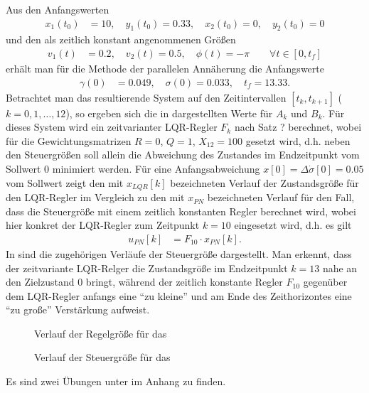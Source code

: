 \begin{exmp}\label{exmp:kap_3_bsp_rf_c2}
Aus den Anfangswerten
\begin{align*}
	x_1(t_0) & = 10,\quad y_1(t_0) = 0.33,\quad x_2(t_0) = 0,\quad y_2(t_0)=0
\end{align*}
und den als zeitlich konstant angenommenen Größen
\begin{align}
	v_1(t) & = 0.2,\quad v_2(t) = 0.5,\quad \phi(t)=-\pi\qquad\forall t\in[0,t_f]
\end{align}
erhält man für die Methode der parallelen Annäherung die Anfangswerte
\begin{align}
	\gamma(0) & = 0.049,\quad \sigma(0)=0.033,\quad t_f=13.33.
\end{align}
Betrachtet man das resultierende System  auf den Zeitintervallen $[t_k,t_{k+1}]$ ($k=0,1,\ldots,12$), so ergeben sich die in
 dargestellten Werte für $A_k$ und $B_k$. Für dieses System wird ein zeitvarianter \ac{LQR}-Regler $F_k$ nach Satz ? berechnet, wobei für die
Gewichtungsmatrizen $R=0$, $Q=1$, $X_{12}=100$ gesetzt wird, d.h. neben den Steuergrößen soll allein die Abweichung des Zustandes im Endzeitpunkt vom Sollwert $0$ minimiert werden. Für
eine Anfangsabweichung $x[0]=\Delta\dot{\sigma}[0]=0.05$ vom Sollwert zeigt  den mit $x_{LQR}[k]$ bezeichneten Verlauf der Zustandsgröße
für den \ac{LQR}-Regler im Vergleich zu den mit $x_{PN}$ bezeichneten Verlauf für den Fall, dass die Steuergröße mit einem zeitlich konstanten Regler berechnet wird, wobei hier konkret
der \ac{LQR}-Regler zum Zeitpunkt $k=10$ eingesetzt wird, d.h. es gilt
\begin{align}
	u_{PN}[k] & = F_{10}\cdot x_{PN}[k]. \label{eqn:kap_3_bsp_rf_bsp_konst_regler}
\end{align}
In  sind die zugehörigen Verläufe der Steuergröße dargestellt. Man erkennt, dass der zeitvariante \ac{LQR}-Relger die Zustandsgröße im
Endzeitpunkt $k=13$ nahe an den Zielzustand $0$ bringt, während der zeitlich konstante Regler $F_{10}$ gegenüber dem \ac{LQR}-Regler anfangs eine "`zu kleine"' und am Ende des
Zeithorizontes eine "`zu große"' Verstärkung aufweist.
\end{exmp}
\begin{figure}[htb]
	\centering
	
	\caption{Verlauf der Regelgröße für das }
	\label{fig:kap_3_bsp_rf_verlauf_regelgroesse}
\end{figure}
\begin{figure}[htb]
	\centering
	
	\caption{Verlauf der Steuergröße für das }
	\label{fig:kap_3_bsp_rf_verlauf_steuergroesse}
\end{figure}
Es sind zwei Übungen unter  im Anhang zu finden.
